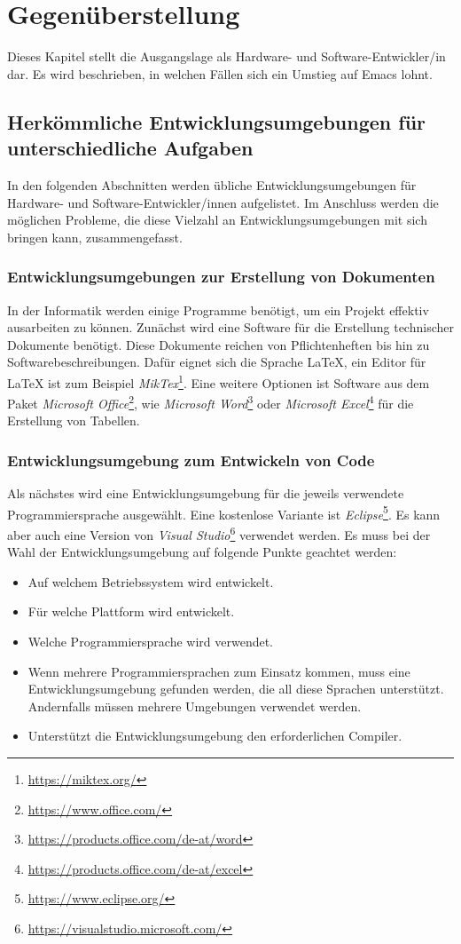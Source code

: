 \chapter{Gegenüberstellung}
\label{cha:sw-entwicklung}
Dieses Kapitel stellt die Ausgangslage als Hardware- und
Software-Entwickler/in dar. Es wird beschrieben, in welchen Fällen
sich ein Umstieg auf Emacs lohnt.

\section{Herkömmliche Entwicklungsumgebungen für unterschiedliche Aufgaben}
In den folgenden Abschnitten werden übliche Entwicklungsumgebungen für
Hardware- und Software-Entwickler/innen aufgelistet. Im Anschluss
werden die möglichen Probleme, die diese Vielzahl an
Entwicklungsumgebungen mit sich bringen kann, zusammengefasst.\\

\subsection{Entwicklungsumgebungen zur Erstellung von Dokumenten}
In der Informatik werden einige Programme benötigt, um ein Projekt
effektiv ausarbeiten zu können. Zunächst wird eine Software für die
Erstellung technischer Dokumente benötigt. Diese Dokumente reichen von
Pflichtenheften bis hin zu Softwarebeschreibungen. Dafür eignet sich
die Sprache LaTeX, ein Editor für LaTeX ist zum Beispiel
\textit{MikTex}\footnote{\url{https://miktex.org/}}. Eine weitere
Optionen ist Software aus dem Paket \textit{Microsoft
  Office}\footnote{\url{https://www.office.com/}}, wie
\textit{Microsoft
  Word}\footnote{\url{https://products.office.com/de-at/word}} oder
\textit{Microsoft
  Excel}\footnote{\url{https://products.office.com/de-at/excel}} für
die Erstellung von Tabellen.\\

\subsection{Entwicklungsumgebung zum Entwickeln von Code}
Als nächstes wird eine Entwicklungsumgebung für die jeweils verwendete
Programmiersprache ausgewählt. Eine kostenlose Variante ist
\textit{Eclipse}\footnote{\url{https://www.eclipse.org/}}. Es kann
aber auch eine Version von \textit{Visual
  Studio}\footnote{\url{https://visualstudio.microsoft.com/}}
verwendet werden. Es muss bei der Wahl der Entwicklungsumgebung auf
folgende Punkte geachtet werden:
\begin{itemize}
\item Auf welchem Betriebssystem wird entwickelt.
\item Für welche Plattform wird entwickelt.
\item Welche Programmiersprache wird verwendet.
\item Wenn mehrere Programmiersprachen zum Einsatz kommen, muss eine
  Entwicklungsumgebung gefunden werden, die all diese Sprachen
  unterstützt. Andernfalls müssen mehrere Umgebungen verwendet werden.
\item Unterstützt die Entwicklungsumgebung den erforderlichen
  Compiler.
\end{itemize}

